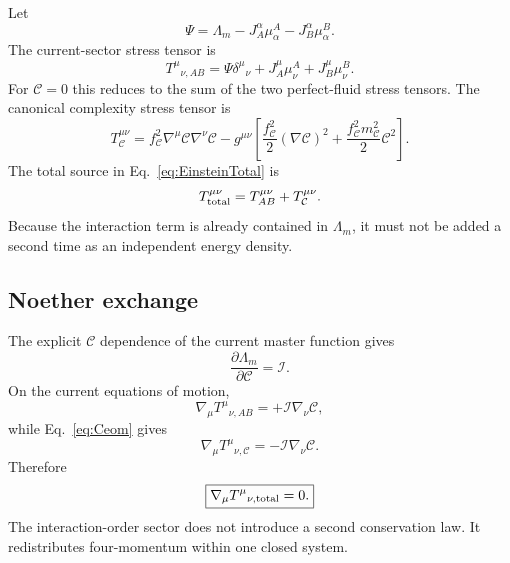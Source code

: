 \documentclass[11pt]{article}
\begin{document}
Let
\begin{equation}
\Psi=\Lambda_m-J_A^\alpha\mu^A_\alpha-J_B^\alpha\mu^B_\alpha.
\label{eq:generalizedpressure}
\end{equation}
The current-sector stress tensor is
\begin{equation}
T^{\mu}{}_{\nu,AB}
=\Psi\delta^\mu{}_{\nu}
+J_A^\mu\mu^A_\nu
+J_B^\mu\mu^B_\nu.
\label{eq:Tcurrents}
\end{equation}
For $\mathcal C=0$ this reduces to the sum of the two perfect-fluid stress tensors.  The canonical complexity stress tensor is
\begin{equation}
T^{\mu\nu}_{\mathcal C}
=f_{\mathcal C}^2\nabla^\mu\mathcal C\nabla^\nu\mathcal C
-g^{\mu\nu}
\left[
\frac{f_{\mathcal C}^2}{2}(\nabla\mathcal C)^2
+\frac{f_{\mathcal C}^2m_{\mathcal C}^2}{2}\mathcal C^2
\right].
\label{eq:TC}
\end{equation}
The total source in Eq.~\eqref{eq:EinsteinTotal} is
\begin{equation}
T^{\mu\nu}_{\rm total}
=T^{\mu\nu}_{AB}+T^{\mu\nu}_{\mathcal C}.
\label{eq:Ttotal}
\end{equation}
Because the interaction term is already contained in $\Lambda_m$, it must not be added a second time as an independent energy density.

\subsection{Noether exchange}

The explicit $\mathcal C$ dependence of the current master function gives
\begin{equation}
\frac{\partial\Lambda_m}{\partial\mathcal C}=\mathcal I.
\label{eq:dLdC}
\end{equation}
On the current equations of motion,
\begin{equation}
\nabla_\mu T^{\mu}{}_{\nu,AB}
=+\mathcal I\nabla_\nu\mathcal C,
\label{eq:exchangeAB}
\end{equation}
while Eq.~\eqref{eq:Ceom} gives
\begin{equation}
\nabla_\mu T^{\mu}{}_{\nu,\mathcal C}
=-\mathcal I\nabla_\nu\mathcal C.
\label{eq:exchangeC}
\end{equation}
Therefore
\begin{equation}
\boxed{
\nabla_\mu T^{\mu}{}_{\nu,\rm total}=0.
}
\label{eq:totalconservation}
\end{equation}
The interaction-order sector does not introduce a second conservation law.  It redistributes four-momentum within one closed system.
\end{document}
